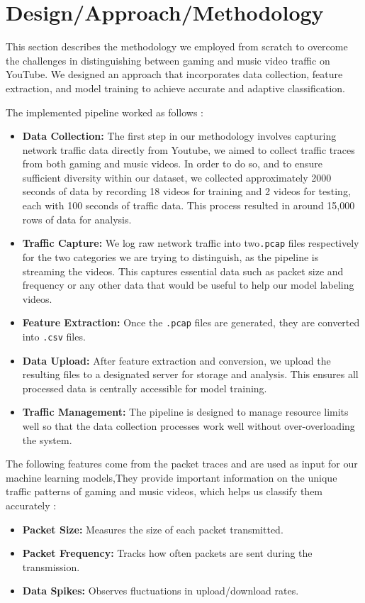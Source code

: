\section{Design/Approach/Methodology} 



\label{sec:design}

This section describes the methodology we employed from scratch to overcome the challenges in distinguishing between gaming and music video traffic on YouTube. We designed an approach that incorporates data collection, feature extraction, and model training to achieve accurate and adaptive classification.

\vspace{2mm}


The implemented pipeline worked as follows :
\begin{itemize}
    \item \textbf{Data Collection:} The first step in our methodology involves capturing network traffic data directly from Youtube, we aimed to collect traffic traces from both gaming and music videos. In order to do so, and to ensure sufficient diversity within our dataset, we collected approximately 2000 seconds of data by recording 18 videos for training and 2 videos for testing, each with 100 seconds of traffic data. This process resulted in around 15,000 rows of data for analysis.
    \item \textbf{Traffic Capture:} We log raw network traffic into two\texttt{.pcap} files respectively for the two categories we are trying to distinguish, as the pipeline is streaming the videos. This captures essential data such as packet size and frequency or any other data that would be useful to help our model labeling videos.
    \item \textbf{Feature Extraction:} Once the \texttt{.pcap} files are generated, they are converted into \texttt{.csv} files.
    \item \textbf{Data Upload:} After feature extraction and conversion, we upload the resulting files to a designated server for storage and analysis. This ensures all processed data is centrally accessible for model training.
    \item \textbf{Traffic Management:} The pipeline is designed to manage resource limits well so that the data collection processes work well without over-overloading the system.
\end{itemize}


The following features come from the packet traces and are used as input for our machine learning models,They provide important information on the unique traffic patterns of gaming and music videos, which helps us classify them accurately :
\begin{itemize}
    \item \textbf{Packet Size:} Measures the size of each packet transmitted.
    \item \textbf{Packet Frequency:} Tracks how often packets are sent during the transmission.
    \item \textbf{Data Spikes:} Observes fluctuations in upload/download rates.
\end{itemize}

